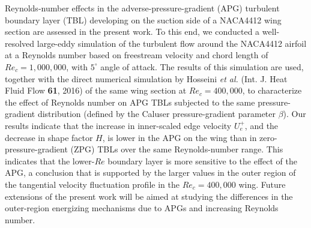 %
\graphicspath{{paper4/imgs/}{paper4/imgs2/}}%
%
%
%
\begin{paper}

\makepapertitle

%
\begin{paperabstract}
	Reynolds-number effects in the adverse-pressure-gradient (APG) turbulent boundary layer (TBL) developing on the suction side of a NACA4412 wing section are assessed in the present work. To this end, we conducted a well-resolved large-eddy simulation of the turbulent flow around the NACA4412 airfoil at a Reynolds number based on freestream velocity and chord length of $Re_{c}=1,000,000$, with $5^{\circ}$ angle of attack. The results of this simulation are used, together with the direct numerical simulation by Hosseini {\it et al.} (Int. J. Heat Fluid Flow {\bf 61}, 2016) of the same wing section at $Re_{c}=400,000$, to characterize the effect of Reynolds number on APG TBLs subjected to the same pressure-gradient distribution (defined by the Caluser pressure-gradient parameter $\beta$). Our results indicate that the increase in inner-scaled edge velocity $U^{+}_{e}$, and the decrease in shape factor $H$, is lower in the APG on the wing than in zero-pressure-gradient (ZPG) TBLs over the same Reynolds-number range. This indicates that the lower-$Re$ boundary layer is more sensitive to the effect of the APG, a conclusion that is supported by the larger values in the outer region of the tangential velocity fluctuation profile in the $Re_{c}=400,000$ wing. Future extensions of the present work will be aimed at studying the differences in the outer-region energizing mechanisms due to APGs and increasing Reynolds number.
\end{paperabstract}


%



%


%
\pagebreak


\end{paper}
